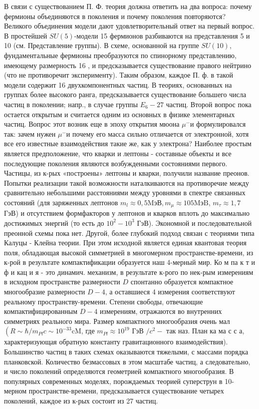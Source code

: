 \documentclass[10pt]{article}
\begin{document}
В связи с существованием П. Ф. теория должна ответить на два вопроса: почему фермионы объединяются в поколения и почему поколения повторяются? Великого объединения модели дают удовлетворительный ответ на первый вопрос. В простейшей $S U(5)$-модели 15 фермионов разбиваются на представления 5 и 10 (см. Представление группы). В схеме, основанной на группе $S U(10)$, фундаментальные фермионы преобразуются по спинорному представлению, имеющему размерность 16 , и предсказывается существование правого нейтрино (что не противоречит эксперименту). Таким образом, каждое П. ф. в такой модели содержит 16 двухкомпонентных частиц. В теориях, основанных на группах более высокого ранга, предсказывается существование большего числа частиц в поколении; напр., в случае группы $E_{6}-27$ частиц. Второй вопрос пока остается открытым и считается одним из основных в физике элементарных частиц. Вопрос этот возник еще в эпоху открытия мюона $\mu^{-}$и формулировался так: зачем нужен $\mu^{-}$и почему его масса сильно отличается от электронной, хотя все его известные взаимодействия такие же, как у электрона? Наиболее простым является предположение, что кварки и лептоны - составные объекты и все последующие поколения являются возбужденными состояниями первого. Частицы, из к-рых «построены» лептоны и кварки, получили название преонов. Попытки реализации такой возможности наталкиваются на противоречие между сравнительно небольшими расстояниями между уровнями в спектре связанных состояний (для заряженных лептонов $m_{l} \approx 0,5 \mathrm{MэВ,} m_{\mu} \approx 105 \mathrm{MэB}$, $m_{\tau} \approx 1,7$ ГэВ) и отсутствием формфакторов у лептонов и кварков вплоть до максимально достижимых энергий (то есть до $10^{2}-10^{3}$ ГэВ). Экономной и последовательной преонной схемы пока нет. Другой, более глубокий подход связан с теориями типа Калуцы - Клейна теории. При этом исходной является единая квантовая теория поля, обладающая высокой симметрией в многомерном пространстве-времени, из к-рой в результате компактификации образуется наш 4-мерный мир. Ко м па к т и ф и кац и я - это динамич. механизм, в результате к-рого по нек-рым измерениям в исходном пространстве размерности $D$ спонтанно образуется компактное многообразие размерности $D-4$, а оставшиеся 4 измерения соответствуют реальному пространству-времени. Степени свободы, отвечающие компактифицированным $D-4$ измерениям, отражаются во внутренних симметриях реального мира. Размер компактного многообразия очень мал $\left(R \sim \hbar / m_{P l} c \sim 10^{-33} \mathrm{cM}\right.$, где $m_{P l} \approx 10^{19}$ ГэВ $/ c^{2}-$ так наз. План ка ма с с а, характеризующая обратную константу гравитационного взаимодействия). Большинство частиц в таких схемах оказываются тяжелыми, с массами порядка планковской. Количество безмассовых в этом масштабе частиц, а следовательно, и число поколений определяются геометрией компактного многообразия. В популярных современных моделях, порождаемых теорией суперструн в 10-мерном пространстве-времени, предсказывается существование четырех поколений, каждое из к-рых состоит из 27 частиц.
\end{document}
